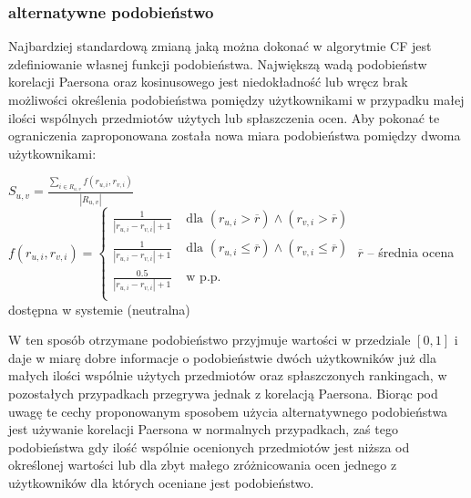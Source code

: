 \documentclass{pracamgr}
\begin{document}
    \subsubsection{alternatywne podobieństwo}
     Najbardziej standardową zmianą jaką można dokonać w algorytmie CF jest zdefiniowanie własnej funkcji podobieństwa.\newline
     Największą wadą podobieństw korelacji Paersona oraz kosinusowego jest niedokładność lub wręcz brak możliwości określenia podobieństwa pomiędzy użytkownikami
     w przypadku małej ilości wspólnych przedmiotów użytych lub spłaszczenia ocen.
     Aby pokonać te ograniczenia zaproponowana została nowa miara podobieństwa pomiędzy dwoma użytkownikami:\newline
     \begin{center}
      $S_{u,v}=\frac{\sum\limits_{i\in R_{u,v}}f(r_{u,i},r_{v,i})}{|R_{u,v}|}$\newline
      $f(r_{u,i},r_{v,i})=\left\{\begin{array}{cc}
                                 \frac{1}{|r_{u,i}-r_{v,i}|+1}& \text{ dla } (r_{u,i}>\overline{r})\wedge(r_{v,i}>\overline{r})\\
                                 \frac{1}{|r_{u,i}-r_{v,i}|+1}& \text{ dla } (r_{u,i}\le\overline{r})\wedge(r_{v,i}\le\overline{r})\\
                                 \frac{0.5}{|r_{u,i}-r_{v,i}|+1}& \text{ w p.p.}\\
                                \end{array}\right.$\newline
     {\scriptsize
     $\overline{r}$ -- średnia ocena dostępna w systemie (neutralna)
     }\newline    
     \end{center}
     W ten sposób otrzymane podobieństwo przyjmuje wartości w przedziale $[0,1]$ i daje w miarę dobre informacje o podobieństwie dwóch użytkowników
     już dla małych ilości wspólnie użytych przedmiotów oraz spłaszczonych rankingach,
     w pozostałych przypadkach przegrywa jednak z korelacją Paersona.\newline
     Biorąc pod uwagę te cechy proponowanym sposobem użycia alternatywnego podobieństwa jest używanie korelacji Paersona w normalnych przypadkach,
     zaś tego podobieństwa gdy ilość wspólnie ocenionych przedmiotów jest niższa od określonej wartości lub dla zbyt małego zróżnicowania ocen
     jednego z użytkowników dla których oceniane jest podobieństwo.
\end{document}
